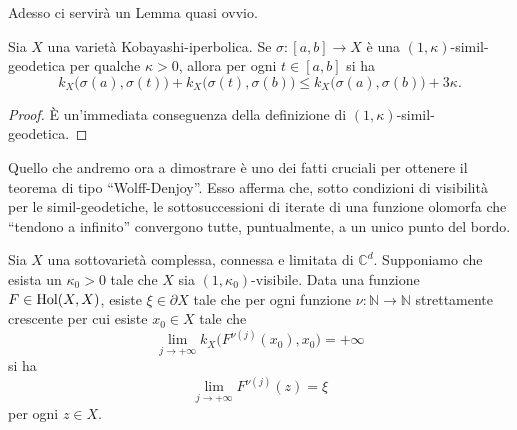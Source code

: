 Adesso ci servirà un Lemma quasi ovvio.

\begin{lm} \label{quasiovvio}
    Sia $X$ una varietà Kobayashi-iperbolica. Se $\sigma:[a,b] \longrightarrow X$ è una $(1,\kappa)$-simil-geodetica per qualche $\kappa>0$, allora per ogni $t \in [a,b]$ si ha
    $$k_X\big(\sigma(a),\sigma(t)\big)+k_X\big(\sigma(t),\sigma(b)\big) \le k_X\big(\sigma(a),\sigma(b)\big)+3\kappa.$$
\end{lm}

\begin{proof}
    È un'immediata conseguenza della definizione di $(1,\kappa)$-simil-geodetica.
\end{proof}

Quello che andremo ora a dimostrare è uno dei fatti cruciali per ottenere il teorema di tipo ``Wolff-Denjoy''. Esso afferma che, sotto condizioni di visibilità per le simil-geodetiche, le sottosuccessioni di iterate di una funzione olomorfa che ``tendono a infinito'' convergono tutte, puntualmente, a un unico punto del bordo.

\begin{prop} \label{inf_impl_ugu}
    Sia $X$ una sottovarietà complessa, connessa e limitata di $\mathbb{C}^d$. Supponiamo che esista un $\kappa_0>0$ tale che $X$ sia $(1,\kappa_0)$-visibile. Data una funzione $F\in\textnormal{Hol}(X,X)$, esiste $\xi\in\partial X$ tale che per ogni funzione $\nu:\mathbb{N}\longrightarrow\mathbb{N}$ strettamente crescente per cui esiste $x_0 \in X$ tale che
    \begin{equation}
        \lim_{j\longrightarrow+\infty} k_X\big(F^{\nu(j)}(x_0),x_0\big)=+\infty
    \end{equation}
    si ha
    \begin{equation}
        \lim_{j\longrightarrow+\infty} F^{\nu(j)}(z)=\xi
    \end{equation}
    per ogni $z \in X$.
\end{prop}

